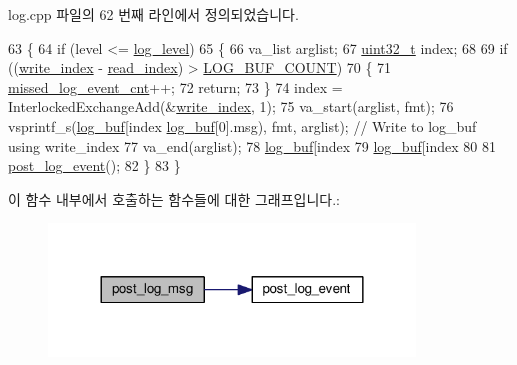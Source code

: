 log.\+cpp 파일의 62 번째 라인에서 정의되었습니다.


\begin{DoxyCode}
63 \{
64     \textcolor{keywordflow}{if} (level <= \hyperlink{classavdecc__lib_1_1log_aa07e39131a3e0ab9ffd691b0f455134d}{log\_level})
65     \{
66         va\_list arglist;
67         \hyperlink{parse_8c_a6eb1e68cc391dd753bc8ce896dbb8315}{uint32\_t} index;
68 
69         \textcolor{keywordflow}{if} ((\hyperlink{classavdecc__lib_1_1log_a44d246646acf5f95a78a87d606f22a42}{write\_index} - \hyperlink{classavdecc__lib_1_1log_a2ccf0f8cb3b20ac18cc9c7bcff1084ad}{read\_index}) > \hyperlink{classavdecc__lib_1_1log_adf764cbdea00d65edcd07bb9953ad2b7a46b4b58fe7f3d2ff3dc4e8f781261727}{LOG\_BUF\_COUNT})
70         \{
71             \hyperlink{classavdecc__lib_1_1log_a3ab71103159d076fcb40d836993a59bc}{missed\_log\_event\_cnt}++;
72             \textcolor{keywordflow}{return};
73         \}
74         index = InterlockedExchangeAdd(&\hyperlink{classavdecc__lib_1_1log_a44d246646acf5f95a78a87d606f22a42}{write\_index}, 1);
75         va\_start(arglist, fmt);
76         vsprintf\_s(\hyperlink{classavdecc__lib_1_1log_a2a5ef536ff60c1a9a38f36c0df2f38da}{log\_buf}[index %
      \hyperlink{classavdecc__lib_1_1log_a2a5ef536ff60c1a9a38f36c0df2f38da}{log\_buf}[0].msg), fmt, arglist); \textcolor{comment}{// Write to log\_buf using write\_index}
77         va\_end(arglist);
78         \hyperlink{classavdecc__lib_1_1log_a2a5ef536ff60c1a9a38f36c0df2f38da}{log\_buf}[index %
79         \hyperlink{classavdecc__lib_1_1log_a2a5ef536ff60c1a9a38f36c0df2f38da}{log\_buf}[index %
80 
81         \hyperlink{classavdecc__lib_1_1log_a2897e19ed8bde731a37c566aa6a57084}{post\_log\_event}();
82     \}
83 \}
\end{DoxyCode}


이 함수 내부에서 호출하는 함수들에 대한 그래프입니다.\+:
\nopagebreak
\begin{figure}[H]
\begin{center}
\leavevmode
\includegraphics[width=276pt]{classavdecc__lib_1_1log_a68139a6297697e4ccebf36ccfd02e44a_cgraph}
\end{center}
\end{figure}


